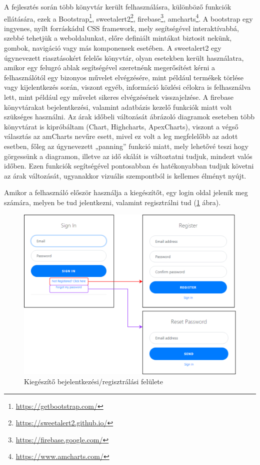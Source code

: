 A fejlesztés során több könyvtár került felhasználásra, különböző funkciók ellátására, ezek a Bootstrap\footnote{\url{https://getbootstrap.com/}}, sweetalert2\footnote{\url{https://sweetalert2.github.io/}}, firebase\footnote{\url{https://firebase.google.com/}}, amcharts\footnote{\url{https://www.amcharts.com/}}. A bootstrap egy ingyenes, nyílt forráskádul CSS framework, mely segítségével interaktívabbá, szebbé tehetjük a weboldalunkat, előre definiált mintákat biztosit nekünk, gombok, navigáció vagy más komponensek esetében. A sweetalert2 egy úgynevezett riasztásokért felelős könyvtár, olyan esetekben került használatra, amikor egy felugró ablak segítségével szeretnénk megerősítést kérni a felhasználótól egy bizonyos művelet elvégzésére, mint például termékek törlése vagy kijelentkezés során, viszont egyéb, információ közlési célokra is felhasználva lett, mint például egy művelet sikeres elvégzésének visszajelzése. A firebase könyvtárakat bejelentkezési, valamint adatbázis kezelő funkciók miatt volt szükséges használni. Az árak időbeli változását ábrázoló diagramok eseteben több könyvtárat is kipróbáltam (Chart, Highcharts, ApexCharts), viszont a végső választás az amCharts nevűre esett, mivel ez volt a leg megfelelőbb az adott esetben, főleg az úgynevezett „panning” funkció miatt, mely lehetővé teszi hogy görgessünk a diagramon, illetve az idő skálát is változtatni tudjuk, mindezt valós időben. Ezen funkciók segítségével pontosabban és hatékonyabban tudjuk követni az árak változását, ugyanakkor vizuális szempontból is kellemes élményt nyújt.

Amikor a felhasználó először használja a kiegészítőt, egy login oldal jelenik meg számára, melyen be tud jelentkezni, valamint regisztrálni tud (\ref{fig:ext_login_reg} ábra).

\begin{figure}[H]
    \centering
    \includegraphics[scale=1]{figures/images/login-reg-ext.png}
    \caption{Kiegészítő bejelentkezési/regisztrálási felülete}
    \label{fig:ext_login_reg}
\end{figure}

